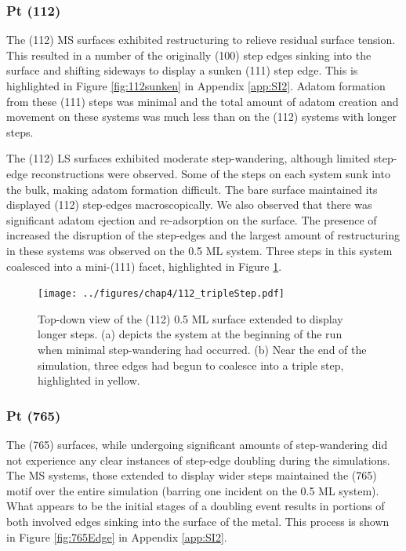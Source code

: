 \subsubsection{Pt (112)}
The (112) MS surfaces exhibited restructuring to relieve residual surface tension.
This resulted in a number of the
originally (100) step edges sinking into the surface and shifting
sideways to display a sunken (111) step edge. This is highlighted in Figure
\ref{fig:112sunken} in Appendix \ref{app:SI2}.  Adatom formation from these (111)
steps was minimal and the total amount of adatom creation and movement on
these systems was much less than on the (112) systems with longer steps. 

The (112) LS surfaces exhibited moderate step-wandering, although limited
step-edge reconstructions were observed. Some of the steps on each system sunk
into the bulk, making adatom formation difficult.  The bare surface maintained
its displayed (112) step-edges macroscopically.  We also observed that there
was significant adatom ejection and re-adsorption on the surface. The presence
of  increased the disruption of the step-edges and the largest amount of
restructuring in these systems was observed on the 0.5 ML system.  Three steps
in this system coalesced into a mini-(111) facet, highlighted in Figure
\ref{fig:tripleStep}.

\begin{figure}
\centering
  \texttt{[image: ../figures/chap4/112\_tripleStep.pdf]}
  \caption{Top-down view of the (112) 0.5 ML surface extended to display longer
steps. (a) depicts the system at the beginning of the run when minimal
step-wandering had occurred. (b) Near the end of the simulation, three edges
had begun to coalesce into a triple step, highlighted in yellow.}
  \label{fig:tripleStep}
\end{figure}

\subsubsection{Pt (765)}
The (765) surfaces, while undergoing significant amounts of step-wandering did
not experience any clear instances of step-edge doubling during the
simulations. The MS systems, those extended to display wider steps maintained
the (765) motif over the entire simulation (barring one incident on the 0.5 ML
system). What appears to be the initial stages of a doubling event results in
portions of both involved edges sinking into the surface of the metal. This
process is shown in Figure \ref{fig:765Edge} in Appendix \ref{app:SI2}.

